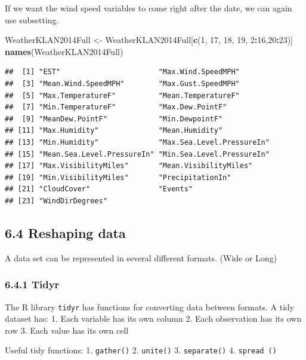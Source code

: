 \documentclass[]{article}
\newenvironment{Shaded}{\begin{snugshade}}{\end{snugshade}}
\newcommand{\KeywordTok}[1]{\textcolor[rgb]{0.13,0.29,0.53}{\textbf{#1}}}
\newcommand{\DecValTok}[1]{\textcolor[rgb]{0.00,0.00,0.81}{#1}}
\newcommand{\StringTok}[1]{\textcolor[rgb]{0.31,0.60,0.02}{#1}}
\newcommand{\OperatorTok}[1]{\textcolor[rgb]{0.81,0.36,0.00}{\textbf{#1}}}
\newcommand{\NormalTok}[1]{#1}
\begin{document}
If we want the wind speed variables to come right after the date, we can
again use subsetting.

\begin{Shaded}
\begin{Highlighting}[]
\NormalTok{WeatherKLAN2014Full <-}\StringTok{ }\NormalTok{WeatherKLAN2014Full[}\KeywordTok{c}\NormalTok{(}\DecValTok{1}\NormalTok{, }\DecValTok{17}\NormalTok{, }\DecValTok{18}\NormalTok{, }\DecValTok{19}\NormalTok{, }\DecValTok{2}\OperatorTok{:}\DecValTok{16}\NormalTok{,}\DecValTok{20}\OperatorTok{:}\DecValTok{23}\NormalTok{)]}
\KeywordTok{names}\NormalTok{(WeatherKLAN2014Full)}
\end{Highlighting}
\end{Shaded}

\begin{verbatim}
##  [1] "EST"                       "Max.Wind.SpeedMPH"        
##  [3] "Mean.Wind.SpeedMPH"        "Max.Gust.SpeedMPH"        
##  [5] "Max.TemperatureF"          "Mean.TemperatureF"        
##  [7] "Min.TemperatureF"          "Max.Dew.PointF"           
##  [9] "MeanDew.PointF"            "Min.DewpointF"            
## [11] "Max.Humidity"              "Mean.Humidity"            
## [13] "Min.Humidity"              "Max.Sea.Level.PressureIn" 
## [15] "Mean.Sea.Level.PressureIn" "Min.Sea.Level.PressureIn" 
## [17] "Max.VisibilityMiles"       "Mean.VisibilityMiles"     
## [19] "Min.VisibilityMiles"       "PrecipitationIn"          
## [21] "CloudCover"                "Events"                   
## [23] "WindDirDegrees"
\end{verbatim}

\subsection{6.4 Reshaping data}\label{reshaping-data}

A data set can be represented in several different formats. (Wide or
Long)

\subsubsection{6.4.1 Tidyr}\label{tidyr}

The R library \texttt{tidyr} has functions for converting data between
formats. A tidy dataset has: 1. Each variable has its own column 2. Each
observation has its own row 3. Each value has its own cell

Useful tidy functions: 1. \texttt{gather()} 2. \texttt{unite()} 3.
\texttt{separate()} 4. \texttt{spread\ ()}
\end{document}
